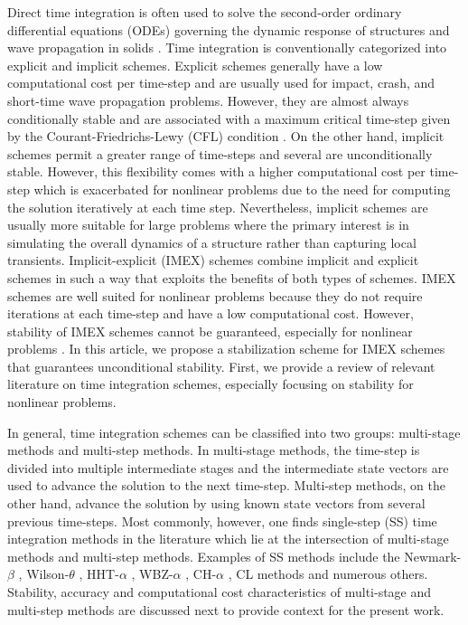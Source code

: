 \documentclass[review]{elsarticle}
\begin{document}
Direct time integration is often used to solve the second-order ordinary differential equations (ODEs) governing the dynamic response of structures and wave propagation in solids \cite{chopra2007dynamics,zienkiewicz2005finite,hughes2012finite,bathe2016finite}.
Time integration is conventionally categorized into explicit and implicit schemes.
Explicit schemes generally have a low computational cost per time-step and are usually used for impact, crash, and short-time wave propagation problems.
However, they are almost always conditionally stable and are associated with a maximum critical time-step given by the Courant-Friedrichs-Lewy (CFL) condition \cite{courant1928partiellen}.
On the other hand, implicit schemes permit a greater range of time-steps and several are unconditionally stable.
However, this flexibility comes with a higher computational cost per time-step which is exacerbated for nonlinear problems due to the need for computing the solution iteratively at each time step. 
Nevertheless, implicit schemes are usually more suitable for large problems where the primary interest is in simulating the overall dynamics of a structure rather than capturing local transients.
Implicit-explicit (IMEX) schemes combine implicit and explicit schemes in such a way that exploits the benefits of both types of schemes.
IMEX schemes are well suited for nonlinear problems because they do not require iterations at each time-step and have a low computational cost.
However, stability of IMEX schemes cannot be guaranteed, especially for nonlinear problems \cite{ascher1995implicit}.
In this article, we propose a stabilization scheme for IMEX schemes that guarantees unconditional stability.
First, we provide a review of relevant literature on time integration schemes, especially focusing on stability for nonlinear problems. 


In general, time integration schemes can be classified into two groups: multi-stage methods and multi-step methods.
In multi-stage methods, the time-step is divided into multiple intermediate stages and the intermediate state vectors are used to advance the solution to the next time-step.
Multi-step methods, on the other hand, advance the solution by using known state vectors from several previous time-steps.
Most commonly, however, one finds single-step (SS) time integration methods in the literature which lie at the intersection of multi-stage methods and multi-step methods.
Examples of SS methods include the Newmark-$\beta$ \cite{newmark1959method}, Wilson-$\theta$ \cite{wilson1968computer}, HHT-$\alpha$ \cite{hilber1977improved}, WBZ-$\alpha$ \cite{wood1980alpha}, CH-$\alpha$ \cite{chung1993time}, CL methods \cite{chung1994new} and numerous others.
Stability, accuracy and computational cost characteristics of multi-stage and multi-step methods are discussed next to provide context for the present work. 
\end{document}
